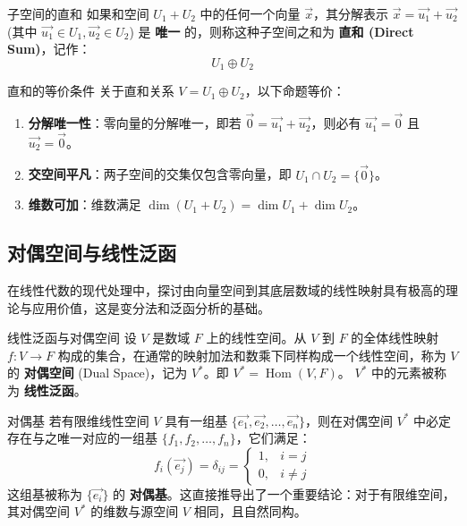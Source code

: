 \documentclass[a4paper,12pt]{ctexart}
\begin{document}
    \begin{mydef}{子空间的直和}{}
        如果和空间 $U_1 + U_2$ 中的任何一个向量 $\vec{x}$，其分解表示 $\vec{x} = \vec{u_1} + \vec{u_2}$ (其中 $\vec{u_1}\in U_1, \vec{u_2}\in U_2$) 是 \textbf{唯一} 的，则称这种子空间之和为 \textbf{直和 (Direct Sum)}，记作：
        \[
        U_1 \oplus U_2
        \]
    \end{mydef}
    
    \begin{mythm}{直和的等价条件}{}
        关于直和关系 $V = U_1 \oplus U_2$，以下命题等价：
        \begin{enumerate}
            \item \textbf{分解唯一性}：零向量的分解唯一，即若 $\vec{0} = \vec{u_1} + \vec{u_2}$，则必有 $\vec{u_1} = \vec{0}$ 且 $\vec{u_2} = \vec{0}$。
            \item \textbf{交空间平凡}：两子空间的交集仅包含零向量，即 $U_1 \cap U_2 = \{\vec{0}\}$。
            \item \textbf{维数可加}：维数满足 $\dim(U_1 + U_2) = \dim U_1 + \dim U_2$。
        \end{enumerate}
    \end{mythm}

\subsection{对偶空间与线性泛函}

在线性代数的现代处理中，探讨由向量空间到其底层数域的线性映射具有极高的理论与应用价值，这是变分法和泛函分析的基础。

\begin{mydef}{线性泛函与对偶空间}{}
    设 $V$ 是数域 $F$ 上的线性空间。从 $V$ 到 $F$ 的全体线性映射 $f: V \to F$ 构成的集合，在通常的映射加法和数乘下同样构成一个线性空间，称为 $V$ 的 \textbf{对偶空间} (Dual Space)，记为 $V^*$。即 $V^* = \operatorname{Hom}(V, F)$。
    $V^*$ 中的元素被称为 \textbf{线性泛函}。
\end{mydef}

\begin{mythm}{对偶基}{}
    若有限维线性空间 $V$ 具有一组基 $\{\vec{e_1}, \vec{e_2}, \dots, \vec{e_n}\}$，则在对偶空间 $V^*$ 中必定存在与之唯一对应的一组基 $\{f_1, f_2, \dots, f_n\}$，它们满足：
    \[
    f_i(\vec{e_j}) = \delta_{ij} = \begin{cases} 1, & i = j \\ 0, & i \neq j \end{cases}
    \]
    这组基被称为 $\{\vec{e_i}\}$ 的 \textbf{对偶基}。这直接推导出了一个重要结论：对于有限维空间，其对偶空间 $V^*$ 的维数与源空间 $V$ 相同，且自然同构。
\end{mythm}
\end{document}
